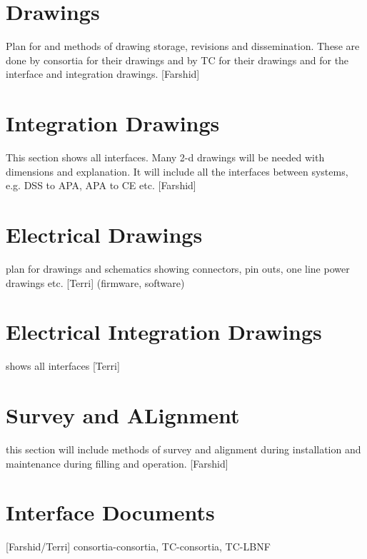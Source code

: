 \section{Drawings}

Plan for and methods of drawing storage, revisions and
dissemination. These are done by consortia for their drawings and by
TC for their drawings and for the interface and integration
drawings. [Farshid]

\section{Integration Drawings}

This section shows all interfaces. Many 2-d drawings will be needed
with dimensions and explanation. It will include all the interfaces
between systems, e.g. DSS to APA, APA to CE etc. [Farshid]

\section{Electrical Drawings}

plan for drawings and schematics showing connectors, pin outs, one
line power drawings etc. [Terri] (firmware, software)



\section{Electrical Integration Drawings}

shows all interfaces [Terri]

\section{Survey and ALignment}

this section will include methods of survey and alignment during
installation and maintenance during filling and operation. [Farshid]

\section{Interface Documents}

[Farshid/Terri] consortia-consortia, TC-consortia, TC-LBNF



